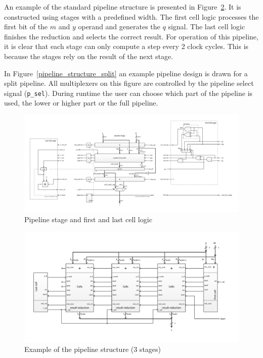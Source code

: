 An example of the standard pipeline structure is presented in Figure~\ref{pipeline_structure}. It is constructed using stages with a predefined width. The first cell logic processes the first bit of the $m$ and $y$ operand and generates the $q$ signal. The last cell logic finishes the reduction and selects the correct result. For operation of this pipeline, it is clear that each stage can only compute a step every 2 clock cycles. This is because the stages rely on the result of the next stage.

In Figure~\ref{pipeline_structure_split} an example pipeline design is drawn for a split pipeline. All multiplexers on
this figure are controlled by the pipeline select signal (\verb|p_sel|). During runtime the user can choose which part
of the pipeline is used, the lower or higher part or the full pipeline.

\newpage 
\begin{figure}[H]
\centering
\includegraphics[trim=1.2cm 1.2cm 1.2cm 1.2cm, width=25cm, angle=90]{pictures/sys_stage.pdf}
\caption{Pipeline stage and first and last cell logic}
\label{stage_structure}
\end{figure}
\newpage

\newpage 
\begin{figure}[H]
\centering
\includegraphics[trim=1.2cm 1.2cm 1.2cm 1.2cm, width=25cm, angle=90]{pictures/sys_pipeline_notsplit.pdf}
\caption{Example of the pipeline structure (3 stages)}
\label{pipeline_structure}
\end{figure}
\newpage

